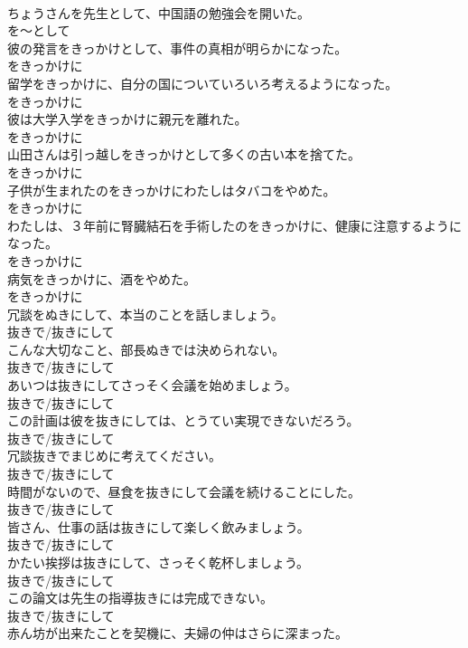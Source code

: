 \documentclass[8pt]{extreport}
\begin{document}
\begin{CJK}{UTF8}{min}
\\	ちょうさんを先生として、中国語の勉強会を開いた。	
\\	を～として
\\	彼の発言をきっかけとして、事件の真相が明らかになった。	
\\	をきっかけに
\\	留学をきっかけに、自分の国についていろいろ考えるようになった。	
\\	をきっかけに
\\	彼は大学入学をきっかけに親元を離れた。	
\\	をきっかけに
\\	山田さんは引っ越しをきっかけとして多くの古い本を捨てた。	
\\	をきっかけに
\\	子供が生まれたのをきっかけにわたしはタバコをやめた。	
\\	をきっかけに
\\	わたしは、３年前に腎臓結石を手術したのをきっかけに、健康に注意するようになった。	
\\	をきっかけに
\\	病気をきっかけに、酒をやめた。	
\\	をきっかけに
\\	冗談をぬきにして、本当のことを話しましょう。	
\\	抜きで/抜きにして
\\	こんな大切なこと、部長ぬきでは決められない。	
\\	抜きで/抜きにして
\\	あいつは抜きにしてさっそく会議を始めましょう。	
\\	抜きで/抜きにして
\\	この計画は彼を抜きにしては、とうてい実現できないだろう。	
\\	抜きで/抜きにして
\\	冗談抜きでまじめに考えてください。	
\\	抜きで/抜きにして
\\	時間がないので、昼食を抜きにして会議を続けることにした。	
\\	抜きで/抜きにして
\\	皆さん、仕事の話は抜きにして楽しく飲みましょう。	
\\	抜きで/抜きにして
\\	かたい挨拶は抜きにして、さっそく乾杯しましょう。	
\\	抜きで/抜きにして
\\	この論文は先生の指導抜きには完成できない。	
\\	抜きで/抜きにして
\\	赤ん坊が出来たことを契機に、夫婦の仲はさらに深まった。	

\end{CJK}
\end{document}
